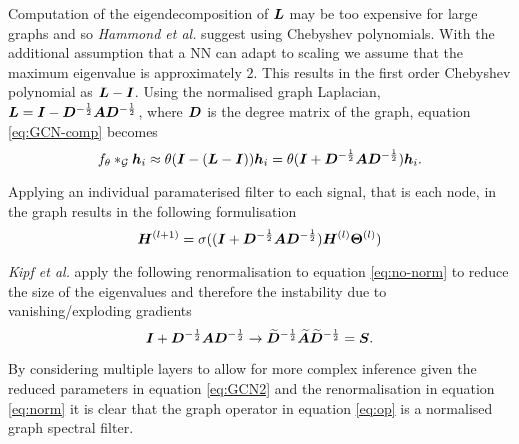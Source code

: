 Computation of the eigendecomposition of ${\bm{L}}$ may be too expensive for large graphs and so \textit{Hammond et al.}\cite{hammond2011wavelets} suggest using Chebyshev polynomials.
With the additional assumption that a NN can adapt to scaling we assume that the maximum eigenvalue is approximately $2$.
This results in the first order Chebyshev polynomial as ${\bm{L}} - {\bm{I}}$.
Using the normalised graph Laplacian, ${\bm{L}} = {\bm{I}} - {\bm{D}}^{-\frac12}{\bm{A}}{\bm{D}}^{-\frac12}$, where ${\bm{D}}$ is the degree matrix of the graph, equation \ref{eq:GCN-comp} becomes
\begin{equation}
    \label{eq:no-norm}
    f_\theta *_{\mathcal{G}} {\bm{h}}_i \approx \theta({\bm{I}} - ({\bm{L}} - {\bm{I}})){\bm{h}}_i = \theta({\bm{I}} + {\bm{D}}^{-\frac12}{\bm{A}}{\bm{D}}^{-\frac12}){\bm{h}}_i.
\end{equation}

Applying an individual paramaterised filter to each signal, that is each node, in the graph results in the following formulisation
\begin{equation}
    \label{eq:GCN2}
    {\bm{H}}^{(l+1)} = \sigma(({\bm{I}} + {\bm{D}}^{-\frac12}{\bm{A}}{\bm{D}}^{-\frac12}){\bm{H}}^{(l)}\bm{\Theta}^{(l)})
\end{equation}

\textit{Kipf et al.}\cite{kipf2016semi} apply the following renormalisation to equation \ref{eq:no-norm} to reduce the size of the eigenvalues and therefore the instability due to vanishing/exploding gradients
\begin{equation}
    \label{eq:norm}
    {\bm{I}} + {\bm{D}}^{-\frac12}{\bm{A}}{\bm{D}}^{-\frac12} \to \widetilde{{\bm{D}}}^{-\frac12}\widetilde{{\bm{A}}}\widetilde{{\bm{D}}}^{-\frac12} = {\bm{S}}.
\end{equation}

By considering multiple layers to allow for more complex inference given the reduced parameters in equation \ref{eq:GCN2} and the renormalisation in equation \ref{eq:norm} it is clear that the graph operator in equation \ref{eq:op} is a normalised graph spectral filter.






